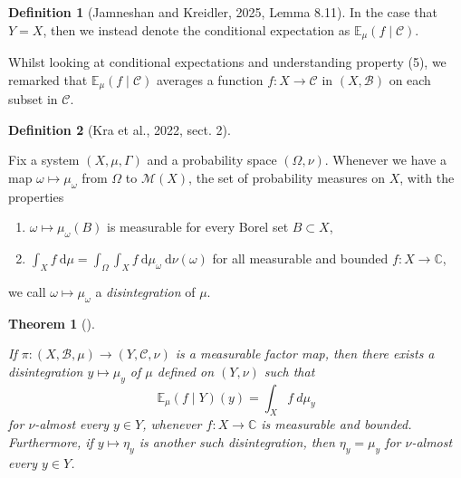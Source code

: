 \documentclass[
  british,
]{article}
\providecommand{\tightlist}{%
  \setlength{\itemsep}{0pt}\setlength{\parskip}{0pt}}
\theoremstyle{plain}
\newtheorem{theorem}{Theorem}[section]
\theoremstyle{definition}
\newtheorem{definition}{Definition}[section]
\theoremstyle{remark}
\newcommand{\Group}{{\Gamma}}
\newcommand{\Measure}{{\mu}}
\newcommand{\SigmaAlgebra}[1]{{\mathscr{#1}}}
\newcommand{\Expectation}[1][\Measure]{{\mathbb{E}}_{#1}}
\begin{document}
\begin{definition}[{Jamneshan and Kreidler, 2025, Lemma
8.11}]
In the case that \(Y=X\), then we instead denote the conditional
expectation as \(\Expectation(f\mid\SigmaAlgebra{C})\).

\end{definition}

Whilst looking at conditional expectations and understanding property
(5), we remarked that \(\Expectation(f\mid\SigmaAlgebra{C})\) averages a
function \(f:X\rightarrow\SigmaAlgebra{C}\) in \((X,\SigmaAlgebra{B})\)
on each subset in \(\SigmaAlgebra{C}\).

\begin{definition}[{Kra et al., 2022, sect.
2}]\protect\hypertarget{def-Disintegration}{}\label{def-Disintegration}

Fix a system \((X,\Measure,\Group)\) and a probability space
\((\Omega,\nu)\). Whenever we have a map
\(\omega\mapsto\Measure_\omega\) from \(\Omega\) to \(\mathcal{M}(X)\),
the set of probability measures on \(X\), with the properties

\begin{enumerate}
\def\labelenumi{\arabic{enumi}.}
\tightlist
\item
  \(\omega\mapsto\Measure_\omega(B)\) is measurable for every Borel set
  \(B\subset X\),
\item
  \(\int_Xf\ \mathrm{d}\Measure=\int_\Omega\int_Xf\ \mathrm{d}\Measure_\omega\ \mathrm{d}\nu(\omega)\)
  for all measurable and bounded \(f:X\rightarrow\mathbb{C}\),
\end{enumerate}

we call \(\omega\mapsto\Measure_\omega\) a \emph{disintegration} of
\(\Measure\).

\end{definition}

\begin{theorem}[]\protect\hypertarget{thm-FactorMapDisintegration}{}\label{thm-FactorMapDisintegration}

If
\(\pi:(X,\SigmaAlgebra{B},\Measure)\rightarrow(Y,\SigmaAlgebra{C},\nu)\)
is a measurable factor map, then there exists a disintegration
\(y\mapsto\Measure_y\) of \(\Measure\) defined on \((Y,\nu)\) such that
\[\Expectation(f\mid Y)(y)=\int_Xf\ d\Measure_y \] for \(\nu\)-almost
every \(y\in Y\), whenever \(f:X\rightarrow\mathbb{C}\) is measurable
and bounded. Furthermore, if \(y\mapsto\eta_y\) is another such
disintegration, then \(\eta_y=\Measure_y\) for \(\nu\)-almost every
\(y\in Y\).

\end{theorem}
\end{document}
